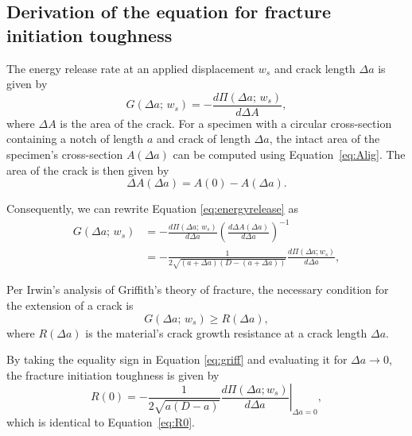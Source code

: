 \documentclass[12pt,onecolumn]{article}
\begin{document}
\begin{bibunit}
\linenumbers
\resetlinenumber
\section{Derivation of the equation for fracture initiation toughness}
\label{sec:R0deriv}
The energy release rate at an applied displacement $w_s$ and crack length $\Delta a$ is given by
%
\begin{equation}
    \label{eq:energyrelease}
    G(\Delta a;\,w_s)=-\frac{d\Pi(\Delta a;\,w_s)}{d\Delta A},
\end{equation}
%
where $\Delta A$ is the area of the crack. For a specimen with a circular cross-section containing a notch of length $a$ and crack of length $\Delta a$, the intact area of the specimen's cross-section $A(\Delta a)$ can be computed using Equation~\eqref{eq:Alig}. The area of the crack is then given by
%
\begin{equation}
    \label{eq:Acrack}
    \Delta A(\Delta a)=A(0)-A(\Delta a).
\end{equation}

Consequently, we can rewrite Equation \eqref{eq:energyrelease} as
\begin{equation}
    \label{eq:energyrelease2}
    \begin{aligned}
    G(\Delta a;\,w_s)&=-\frac{d\Pi(\Delta a;\,w_s)}{d\Delta a}\left(\frac{d \Delta A(\Delta a)}{d\Delta a}\right)^{-1}\\
    &=-\frac{1}{2\sqrt{(a+\Delta a)(D-(a+\Delta a))}}\frac{d\Pi(\Delta a; w_s)}{d\Delta a },
    \end{aligned}
\end{equation}

Per Irwin's analysis of Griffith's theory of fracture, the necessary condition for the extension of a crack is
%
\begin{equation}
\label{eq:griff}
G(\Delta a;\,w_s) \geq R(\Delta a),
\end{equation}
%
where $R(\Delta a)$ is the material's crack growth resistance at a crack length $\Delta a$.

By taking the equality sign in Equation \eqref{eq:griff} and evaluating it for $\Delta a \to 0$, the fracture initiation toughness is given by
%
\begin{equation}
    \label{eq:R0deriv}
    R(0)=-\frac{1}{2\sqrt{a(D-a)}} \left.\frac{d\Pi(\Delta a; w_s)}{d\Delta a }\right\vert_{\Delta a=0},
\end{equation}
%
which is identical to Equation~\eqref{eq:R0}.


\end{bibunit}
\end{document}

